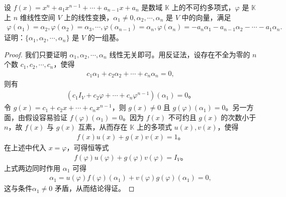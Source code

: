 \documentclass[../../main.tex]{subfiles}
\begin{document}
\begin{proposition}
设 $f(x) = x^n + a_1 x^{n-1} + \cdots + a_{n-1} x + a_n$ 是数域 $\mathbb{K}$ 上的不可约多项式，$\varphi$ 是 $\mathbb{K}$ 上 $n$ 维线性空间 $V$ 上的线性变换，$\alpha_1 \neq 0, \alpha_2, \cdots, \alpha_n$ 是 $V$ 中的向量，满足
\begin{align*}
\varphi (\alpha _1)=\alpha _2,\varphi (\alpha _2)=\alpha _3,\cdots ,\varphi (\alpha _{n-1})=\alpha _n,\varphi (\alpha _n)=-a_n\alpha _1-a_{n-1}\alpha _2-\cdots -a_1\alpha _n.
\end{align*}
证明：$\{\alpha_1, \alpha_2, \cdots, \alpha_n\}$ 是 $V$ 的一组基。
\end{proposition}
\begin{proof}
我们只要证明 $\alpha_1, \alpha_2, \cdots, \alpha_n$ 线性无关即可。用反证法，设存在不全为零的 $n$ 个数 $c_1, c_2, \cdots, c_n$，使得
\begin{align*}
c_1 \alpha_1 + c_2 \alpha_2 + \cdots + c_n \alpha_n = 0,
\end{align*}
则有
\begin{align*}
(c_1 I_V + c_2 \varphi + \cdots + c_n \varphi^{n-1})(\alpha_1) = 0。
\end{align*}
令 $g(x) = c_1 + c_2 x + \cdots + c_n x^{n-1}$，则 $g(x) \neq 0$ 且 $g(\varphi)(\alpha_1) = 0$。另一方面，由假设容易验证 $f(\varphi)(\alpha_1) = 0$。因为 $f(x)$ 不可约且 $g(x)$ 的次数小于 $n$，故 $f(x)$ 与 $g(x)$ 互素，从而存在 $\mathbb{K}$ 上的多项式 $u(x), v(x)$，使得
\begin{align*}
f(x)u(x) + g(x)v(x) = 1。
\end{align*}
在上述中代入 $x = \varphi$，可得恒等式
\begin{align*}
f(\varphi)u(\varphi) + g(\varphi)v(\varphi) = I_V。
\end{align*}
上式两边同时作用 $\alpha_1$ 可得
\begin{align*}
\alpha_1 = u(\varphi)f(\varphi)(\alpha_1) + v(\varphi)g(\varphi)(\alpha_1) = 0,
\end{align*}
这与条件$\alpha_1 \neq 0$ 矛盾，从而结论得证。
\end{proof}
\end{document}
